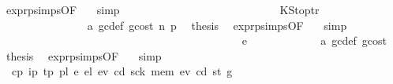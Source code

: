 \begin{isabellebody}
\ expr{\isachardot}{\kern0pt}psimps{\isacharparenleft}{\kern0pt}{}{}{\isacharparenright}{\kern0pt}{\isacharbrackleft}{\kern0pt}OF\ {}{}{\isacharparenleft}{\kern0pt}{}{\isacharparenright}{\kern0pt}{\isacharbrackright}{\kern0pt}\ \isamarkupfalse%
\ simp\isanewline
\ \ \ \ \ \ \ \ \ \ \ \ \isamarkupfalse%
\isanewline
\ \ \ \ \ \ \ \ \ \ \ \ \ \ \isamarkupfalse%
\ {\isacharparenleft}{\kern0pt}KStoptr\ {\isacharunderscore}{\kern0pt}{\isacharparenright}{\kern0pt}\isanewline
\ \ \ \ \ \ \ \ \ \ \ \ \ \ \isamarkupfalse%
\ a{}\ gc{\isacharunderscore}{\kern0pt}def\ gcost\ n\ p{}\ \isamarkupfalse%
\ {\isacharquery}{\kern0pt}thesis\ \isamarkupfalse%
\ expr{\isachardot}{\kern0pt}psimps{\isacharparenleft}{\kern0pt}{}{}{\isacharparenright}{\kern0pt}{\isacharbrackleft}{\kern0pt}OF\ {}{}{\isacharparenleft}{\kern0pt}{}{\isacharparenright}{\kern0pt}{\isacharbrackright}{\kern0pt}\ \isamarkupfalse%
\ simp\isanewline
\ \ \ \ \ \ \ \ \ \ \ \ \isamarkupfalse%
\isanewline
\ \ \ \ \ \ \ \ \ \ \isamarkupfalse%
\isanewline
\ \ \ \ \ \ \ \ \isamarkupfalse%
\isanewline
\ \ \ \ \ \ \ \ \ \ \isamarkupfalse%
\ {\isacharparenleft}{\kern0pt}e\ {\isacharunderscore}{\kern0pt}{\isacharparenright}{\kern0pt}\isanewline
\ \ \ \ \ \ \ \ \ \ \isamarkupfalse%
\ a{}\ gc{\isacharunderscore}{\kern0pt}def\ gcost\ \isamarkupfalse%
\ {\isacharquery}{\kern0pt}thesis\ \isamarkupfalse%
\ expr{\isachardot}{\kern0pt}psimps{\isacharparenleft}{\kern0pt}{}{}{\isacharparenright}{\kern0pt}{\isacharbrackleft}{\kern0pt}OF\ {}{}{\isacharparenleft}{\kern0pt}{}{\isacharparenright}{\kern0pt}{\isacharbrackright}{\kern0pt}\ \isamarkupfalse%
\ simp\isanewline
\ \ \ \ \ \ \ \ \isamarkupfalse%
\isanewline
\ \ \ \ \ \ \isamarkupfalse%
\isanewline
\ \ \ \ \isamarkupfalse%
\isanewline
\ \ \isamarkupfalse%
\isanewline
{}\isamarkupfalse%
\isanewline
\ \ \isamarkupfalse%
\ {\isacharparenleft}{\kern0pt}{}{}\ cp\ i\isactrlsub p\ t\isactrlsub p\ pl\ e\ el\ e\isactrlsub v{\isacharprime}{\kern0pt}\ cd{\isacharprime}{\kern0pt}\ sck{\isacharprime}{\kern0pt}\ mem{\isacharprime}{\kern0pt}\ e\isactrlsub v\ cd\ st\ g{\isacharparenright}{\kern0pt}\isanewline

\end{isabellebody}

